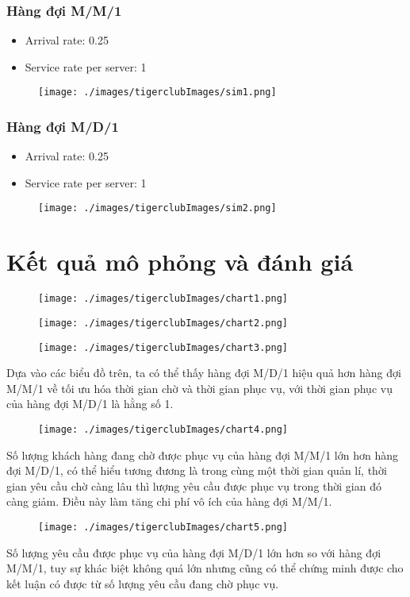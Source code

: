 \documentclass[a4paper]{article}
\begin{document}
\subsubsection*{Hàng đợi M/M/1}
\begin{itemize}
\item Arrival rate: 0.25
\item Service rate per server: 1
\end{itemize}
\begin{figure}[H]
\texttt{[image: ./images/tigerclubImages/sim1.png]}
\end{figure}
\subsubsection*{Hàng đợi M/D/1}
\begin{itemize}
\item Arrival rate: 0.25
\item Service rate per server: 1
\end{itemize}
\begin{figure}[H]
\texttt{[image: ./images/tigerclubImages/sim2.png]}
\end{figure}
\section{Kết quả mô phỏng và đánh giá}
\begin{figure}[H]
\centering
\texttt{[image: ./images/tigerclubImages/chart1.png]}
\end{figure}
\begin{figure}[H]
\centering
\texttt{[image: ./images/tigerclubImages/chart2.png]}
\end{figure}
\begin{figure}[H]
\centering
\texttt{[image: ./images/tigerclubImages/chart3.png]}
\end{figure}
Dựa vào các biểu đồ trên, ta có thể thấy hàng đợi M/D/1 hiệu quả hơn hàng đợi M/M/1 về tối ưu hóa thời gian chờ và thời gian phục vụ, với thời gian phục vụ của hàng đợi M/D/1 là hằng số 1.
\begin{figure}[H]
\centering
\texttt{[image: ./images/tigerclubImages/chart4.png]}
\end{figure}
\noindent
Số lượng khách hàng đang chờ được phục vụ của hàng đợi M/M/1 lớn hơn hàng đợi M/D/1, có thể hiểu tương đương là trong cùng một thời gian quản lí, thời gian yêu cầu chờ càng lâu thì lượng yêu cầu được phục vụ trong thời gian đó càng giảm. Điều này làm tăng chi phí vô ích của hàng đợi M/M/1.
\begin{figure}[H]
\centering
\texttt{[image: ./images/tigerclubImages/chart5.png]}
\end{figure}
\noindent
Số lượng yêu cầu được phục vụ của hàng đợi M/D/1 lớn hơn so với hàng đợi M/M/1, tuy sự khác biệt không quá lớn nhưng cũng có thể chứng minh được cho kết luận có được từ số lượng yêu cầu đang chờ phục vụ.
\end{document}
